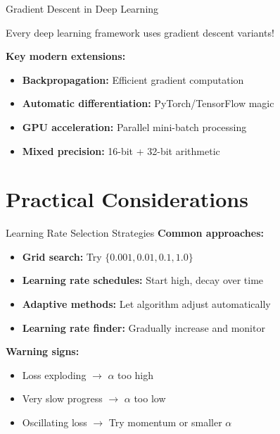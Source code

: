 \documentclass[usenames,dvipsnames]{beamer}
\begin{document}
  \begin{frame}{Gradient Descent in Deep Learning}
    \begin{keypointsbox}{}
    Every deep learning framework uses gradient descent variants!
    \end{keypointsbox}
    
    \pause
    \textbf{Key modern extensions:}
    \begin{itemize}[<+->]
        \item \textbf{Backpropagation:} Efficient gradient computation
        \item \textbf{Automatic differentiation:} PyTorch/TensorFlow magic
        \item \textbf{GPU acceleration:} Parallel mini-batch processing
        \item \textbf{Mixed precision:} 16-bit + 32-bit arithmetic
    \end{itemize}
  \end{frame}

  \section{Practical Considerations}

  \begin{frame}{Learning Rate Selection Strategies}
    \textbf{Common approaches:}
    
    \begin{itemize}[<+->]
        \item \textbf{Grid search:} Try $\{0.001, 0.01, 0.1, 1.0\}$
        \item \textbf{Learning rate schedules:} Start high, decay over time
        \item \textbf{Adaptive methods:} Let algorithm adjust automatically  
        \item \textbf{Learning rate finder:} Gradually increase and monitor
    \end{itemize}
    
    \pause
    \textbf{Warning signs:}
    \begin{itemize}[<+->]
        \item Loss exploding $\rightarrow$ $\alpha$ too high
        \item Very slow progress $\rightarrow$ $\alpha$ too low
        \item Oscillating loss $\rightarrow$ Try momentum or smaller $\alpha$
    \end{itemize}
  \end{frame}
\end{document}
